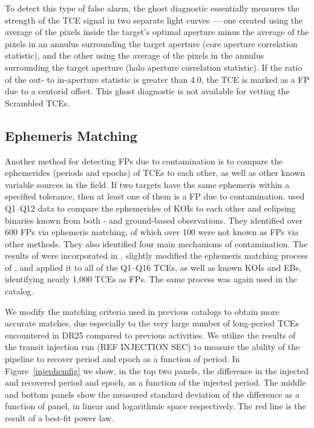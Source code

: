 To detect this type of false alarm, the ghost diagnostic essentially measures the strength of the TCE signal in two separate light curves --- one created using the average of the pixels inside the target's optimal aperture minus the average of the pixels in an annulus surrounding the target aperture (core aperture correlation statistic), and the other using the average of the pixels in the annulus surrounding the target aperture (halo aperture correlation statistic). If the ratio of the out- to in-aperture statistic is greater than 4.0, the TCE is marked as a FP due to a centorid offset. This ghost diagnostic is not available for vetting the Scrambled TCEs.  


\subsection{Ephemeris Matching}
\label{ephemmatchsec}

Another method for detecting FPs due to contamination is to compare the ephemerides (periods and epochs) of TCEs to each other, as well as other known variable sources in the \kepler{} field. If two targets have the same ephemeris within a specified tolerance, then at least one of them is a FP due to contamination. \citet{Coughlin2014a} used Q1--Q12 data to compare the ephemerides of KOIs to each other and eclipsing binaries known from both \kepler{}- and ground-based observations. They identified over 600 FPs via ephemeris matching, of which over 100 were not known as FPs via other methods. They also identified four main mechanisms of contamination. The results of \citet{Coughlin2014a} were incorporated in \citet[][see \S3.3]{Rowe2015a}. \citet[][see \S5.3]{Mullally2015cat} slightly modified the ephemeris matching process of \citet{Coughlin2014a}, and applied it to all of the Q1--Q16 TCEs, as well as known KOIs and EBs, identifying nearly 1,000 TCEs as FPs. The same process was again used in the \citet{Coughlin2016} catalog.

We modify the matching criteria used in previous catalogs to obtain more accurate matches, due especially to the very large number of long-period TCEs encountered in DR25 compared to previous activities. We utilize the results of the transit injection run (REF INJECTION SEC) to measure the ability of the \kepler{} pipeline to recover period and epoch as a function of period. In Figure~\ref{injephemfig} we show, in the top two panels, the difference in the injected and recovered period and epoch, as a function of the injected period. The middle and bottom panels show the measured standard deviation of the difference as a function of panel, in linear and logarithmic space respectively. The red line is the result of a best-fit power law.

